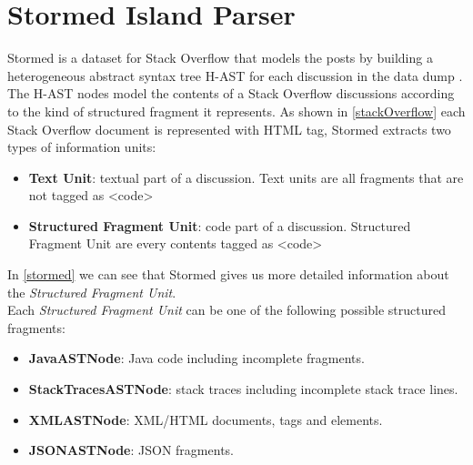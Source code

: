 \documentclass[12pt,mscthesis]{usiinfthesis}
\begin{document}
\newpage
	\section{Stormed Island Parser}
	
	 Stormed is a dataset for Stack Overflow that models the posts by building a heterogeneous abstract syntax tree H-AST for each discussion in the data dump \cite{Ponz2015a}.  The H-AST nodes model the contents of a Stack Overflow discussions according to the kind of structured fragment it represents. As shown in \cref{stackOverflow} each Stack Overflow document is represented with HTML tag, Stormed extracts two types of information units:
	 	 \begin{itemize}
		\item \textbf{Text Unit}: textual part of a discussion. Text units are all fragments that are not tagged as <code>	
		\item \textbf{Structured Fragment Unit}: code part of a discussion. Structured Fragment Unit are every contents tagged as <code> 
	 \end{itemize}

	 In \cref{stormed} we can see that Stormed gives us more detailed information about the \textit{Structured Fragment Unit}.\\
	 Each \textit{Structured Fragment Unit} can be one of the following possible structured fragments:
	 \begin{itemize}
	 \item \textbf{JavaASTNode}: Java code including incomplete fragments.
	 \item \textbf{StackTracesASTNode}: stack traces including incomplete stack trace lines.
	 \item \textbf{XMLASTNode}: XML/HTML documents, tags and elements.
	 \item \textbf{JSONASTNode}: JSON fragments.
	 \end{itemize}
\end{document}
